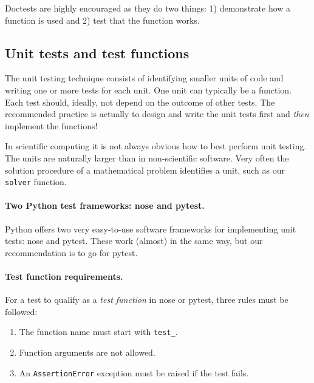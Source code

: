\documentclass[graybox,sectrefs,envcountresetchap,open=right,final]{svmonodo}
\begin{document}
Doctests are highly encouraged as they do two things: 1) demonstrate
how a function is used and 2) test that the function works.


\subsection{Unit tests and test functions}


The unit testing technique consists of identifying smaller units
of code and writing one or more tests for
each unit. One unit can typically be a function.
Each test should, ideally, not depend on the outcome of
other tests. The recommended practice is actually to
design and write the unit tests first and \emph{then} implement the functions!

In scientific computing it is not always obvious how to best perform
unit testing. The units are naturally larger than in non-scientific
software. Very often the solution procedure of a mathematical problem
identifies a unit, such as our \texttt{solver} function.


\paragraph{Two Python test frameworks: nose and pytest.}
Python offers two very easy-to-use software frameworks for implementing
unit tests: nose and pytest. These work (almost) in the same way,
but our recommendation is to go for pytest.

\paragraph{Test function requirements.}
For a test to qualify as a \emph{test function} in nose or pytest, three
rules must be followed:

\begin{enumerate}
 \item The function name must start with \Verb!test_!.

 \item Function arguments are not allowed.

 \item An \texttt{AssertionError} exception must be raised if the test fails.
\end{enumerate}
\end{document}
